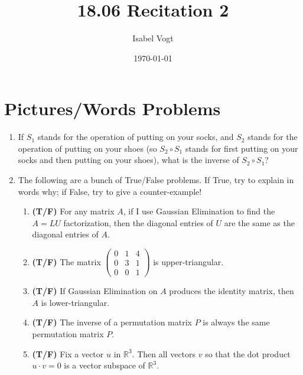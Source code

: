 \documentclass[11pt]{article}
\title{18.06 Recitation 2}
\author{Isabel Vogt}
\date{\today}                                           %
\newcommand{\rr}{\mathbb{R}}
\begin{document}
\maketitle
\section{Pictures/Words Problems}

\begin{enumerate}

\item If $S_1$ stands for the operation of putting on your socks, and $S_2$ stands for the operation of putting on your shoes (so $S_2 \circ S_1$ stands for first putting on your socks and then putting on your shoes), what is the inverse of $S_2 \circ S_1$?

\item The following are a bunch of True/False problems.  If True, try to explain in words why; if False, try to give a counter-example!

\begin{enumerate}

\item \textbf{(T/F)} For any matrix $A$, if I use Gaussian Elimination to find the $A = LU$ factorization, then the diagonal entries of $U$ are the same as the diagonal entries of $A$.

\item \textbf{(T/F)} The matrix $\begin{pmatrix} 0 & 1 & 4 \\ 0 & 3 &1 \\ 0& 0 & 1 \end{pmatrix}$ is upper-triangular.

\item \textbf{(T/F)} If Gaussian Elimination on $A$ produces the identity matrix, then $A$ is lower-triangular.

\item \textbf{(T/F)} The inverse of a permutation matrix $P$ is always the same permutation matrix $P$.

\item \textbf{(T/F)} Fix a vector $u$ in $\rr^3$.  Then all vectors $v$ so that the dot product $u \cdot v =0$ is a vector subspace of $\rr^3$.




\end{enumerate}
\end{enumerate}
\end{document}
